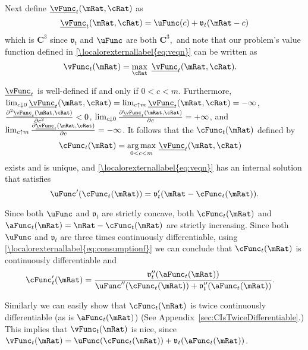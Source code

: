\documentclass[\econtexRoot/BufferStockTheory.tex]{subfiles}
\begin{document}
Next define $\ushort{\vFunc}_{t}(\mRat,\cRat)$ as
\begin{equation}
\ushort{\vFunc}_{t}(\mRat,\cRat)=\uFunc(c)+\mathfrak{v}_{t}(\mRat-c)
\end{equation}
which is $\mathbf{C}^{3}$ since $\mathfrak{v}_{t}$ and $\uFunc$ are both
$\mathbf{C}^{3},$ and note that our problem's value function defined
in \eqref{\localorexternallabel{eq:veqn}} can be written as
\begin{align}
\vFunc_{t}(\mRat)  & =  \max_{\cRat}~\ushort{\vFunc}_{t}(\mRat,\cRat).
\end{align}

$\ushort{\vFunc}_{t}$ is well-defined if and only if $0<c<m$.  Furthermore,
$\lim_{c \downarrow
  0}\ushort{\vFunc}_{t}(\mRat,\cRat)=\lim_{c\uparrow m} \ushort{\vFunc}_{t}(\mRat,\cRat)=-\infty $, $\frac{\partial ^{2}\ushort{\vFunc}_{t}(\mRat,\cRat)}{\partial c^{2}}%
<0$, $\lim_{c \downarrow 0}\frac{\partial \ushort{\vFunc}_{t}(\mRat,\cRat)}{\partial c}%
=+\infty $, and $\lim_{c\uparrow m} \frac{\partial \ushort{\vFunc}_{t}(\mRat,\cRat)}{%
\partial c}=-\infty $. It follows that the $\cFunc_{t}(\mRat)$ defined by
\begin{align}
\cFunc_{t}(\mRat)  & = \underset{0<c<m}{\arg \max }~\ushort{\vFunc}_{t}(\mRat,\cRat)
\end{align}
exists and is unique, and \eqref{\localorexternallabel{eq:veqn}} has an internal
solution that satisfies
\begin{equation}
\uFunc^{\prime }(\cFunc_{t}(\mRat))=\mathfrak{v}_{t}^{\prime }(\mRat-\cFunc_{t}(\mRat))  \label{eq:consumptionf}.
\end{equation}


Since both $\uFunc$ and $\mathfrak{v}_{t}$ are strictly concave, both
$\cFunc_{t}(\mRat)$ and $\aFunc_{t}(\mRat)=\mRat-\cFunc_{t}(\mRat)$
are strictly increasing. Since both $\uFunc$ and $\mathfrak{v}_{t}$ are
three times continuously differentiable, using \eqref{\localorexternallabel{eq:consumptionf}} we can conclude that
$\cFunc_{t}(\mRat)$ is continuously differentiable and
\begin{align}
\cFunc_{t}^{\prime }(\mRat)  & = \frac{\mathfrak{v}_{t}^{\prime \prime }({\aFunc}_{t}(\mRat))  }{\uFunc^{\prime \prime }(\cFunc_{t}(\mRat))+\mathfrak{v}_{t}^{\prime \prime }({\aFunc}_{t}(\mRat))}.
\end{align}

Similarly we can easily show that $\cFunc_{t}(\mRat)$ is twice
continuously differentiable (as is $\aFunc_{t}(\mRat)$) (See
Appendix~\ref{sec:CIsTwiceDifferentiable}.)  This implies that
$\vFunc_{t}(\mRat)$ is nice, since
$\vFunc_{t}(\mRat)=\uFunc(\cFunc_{t}(\mRat))+\mathfrak{v}_{t}({\aFunc}_{t}(\mRat))$.
\end{document}
